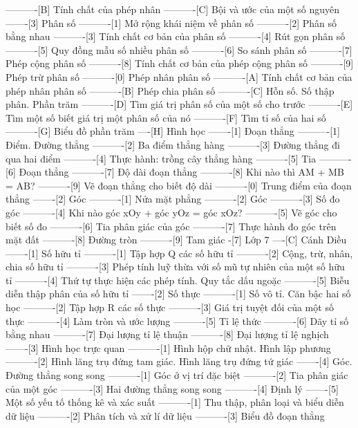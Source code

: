 ----------[B] Tính chất của phép nhân
----------[C] Bội và ước của một số nguyên
-------[3] Phân số
----------[1] Mở rộng khái niệm về phân số
----------[2] Phân số bằng nhau
----------[3] Tính chất cơ bản của phân số
----------[4] Rút gọn phân số
----------[5] Quy đồng mẫu số nhiều phân số
----------[6] So sánh phân số
----------[7] Phép cộng phân số
----------[8] Tính chất cơ bản của phép cộng phân số
----------[9] Phép trừ phân số
----------[0] Phép nhân phân số
----------[A] Tính chất cơ bản của phép nhân phân số
----------[B] Phép chia phân số
----------[C] Hỗn số. Số thập phân. Phần trăm
----------[D] Tìm giá trị phân số của một số cho trước
----------[E] Tìm một số biết giá trị một phân số của nó
----------[F] Tìm tỉ số của hai số
----------[G] Biểu đồ phần trăm
----[H] Hình học
-------[1] Đoạn thẳng
----------[1] Điểm. Đường thẳng
----------[2] Ba điểm thẳng hàng
----------[3] Đường thẳng đi qua hai điểm
----------[4] Thực hành: trồng cây thẳng hàng
----------[5] Tia
----------[6] Đoạn thẳng
----------[7] Độ dài đoạn thẳng
----------[8] Khi nào thì AM + MB = AB?
----------[9] Vẽ đoạn thẳng cho biết độ dài
----------[0] Trung điểm của đoạn thẳng
-------[2] Góc
----------[1] Nửa mặt phẳng
----------[2] Góc
----------[3] Số đo góc
----------[4] Khi nào góc xOy + góc yOz = góc xOz?
----------[5] Vẽ góc cho biết số đo
----------[6] Tia phân giác của góc
----------[7] Thực hành đo góc trên mặt đất
----------[8] Đường tròn
----------[9] Tam giác
-[7] Lớp 7
----[C] Cánh Diều
-------[1] Số hữu tỉ
----------[1] Tập hợp Q các số hữu tỉ
----------[2] Cộng, trừ, nhân, chia số hữu tỉ
----------[3] Phép tính luỹ thừa với số mũ tự nhiên của một số hữu tỉ
----------[4] Thứ tự thực hiện các phép tính. Quy tắc dấu ngoặc
----------[5] Biễu diễn thập phân của số hữu tỉ
-------[2] Số thực
----------[1] Số vô tỉ. Căn bậc hai số học
----------[2] Tập hợp R các số thực
----------[3] Giá trị tuyệt đối của một số thực
----------[4] Làm tròn và ước lượng
----------[5] Tỉ lệ thức
----------[6] Dãy tỉ số bằng nhau
----------[7] Đại lượng tỉ lệ thuận
----------[8] Đại lượng tỉ lệ nghịch
-------[3] Hình học trực quan
----------[1] Hình hộp chữ nhật. Hình lập phương
----------[2] Hình lăng trụ đứng tam giác. Hình lăng trụ đứng tứ giác
-------[4] Góc. Đường thẳng song song
----------[1] Góc ở vị trí đặc biệt
----------[2] Tia phân giác của một góc
----------[3] Hai đường thẳng song song
----------[4] Định lý
-------[5] Một số yếu tố thống kê và xác suất
----------[1] Thu thập, phân loại và biểu diễn dữ liệu
----------[2] Phân tích và xử lí dữ liệu
----------[3] Biểu đồ đoạn thẳng
